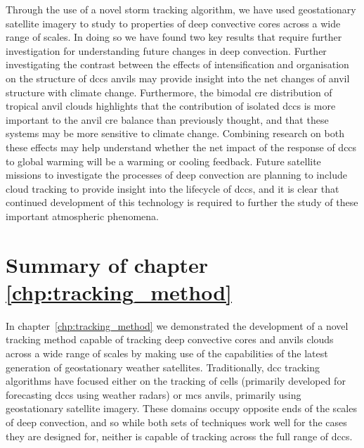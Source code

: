 Through the use of a novel storm tracking algorithm, we have used geostationary satellite imagery to study to properties of deep convective cores across a wide range of scales. In doing so we have found two key results that require further investigation for understanding future changes in deep convection. Further investigating the contrast between the effects of intensification and organisation on the structure of \acrshort{dcc}s anvils may provide insight into the net changes of anvil structure with climate change. Furthermore, the bimodal \acrshort{cre} distribution of tropical anvil clouds highlights that the contribution of isolated \acrshort{dcc}s is more important to the anvil \acrshort{cre} balance than previously thought, and that these systems may be more sensitive to climate change. Combining research on both these effects may help understand whether the net impact of the response of \acrshort{dcc}s to global warming will be a warming or cooling feedback. Future satellite missions to investigate the processes of deep convection are planning to include cloud tracking to provide insight into the lifecycle of \acrshort{dcc}s, and it is clear that continued development of this technology is required to further the study of these important atmospheric phenomena.


\section{Summary of chapter \ref{chp:tracking_method}}

In chapter~\ref{chp:tracking_method} we demonstrated the development of a novel tracking method capable of tracking deep convective cores and anvils clouds across a wide range of scales by making use of the capabilities of the latest generation of geostationary weather satellites.
Traditionally, \acrshort{dcc} tracking algorithms have focused either on the tracking of cells (primarily developed for forecasting \acrshort{dcc}s using weather radars) or \acrshort{mcs} anvils, primarily using geostationary satellite imagery.
These domains occupy opposite ends of the scales of deep convection, and so while both sets of techniques work well for the cases they are designed for, neither is capable of tracking across the full range of \acrshort{dcc}s.

